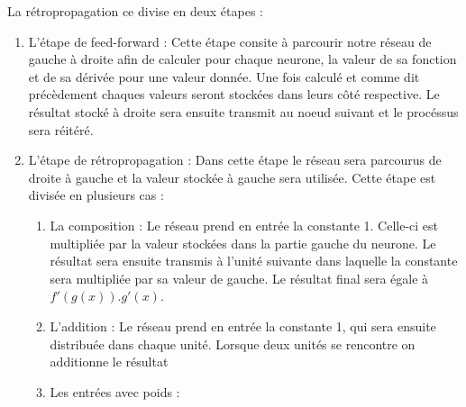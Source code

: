 \documentclass{article}
\begin{document}
La rétropropagation ce divise en deux étapes :
\begin{enumerate}
\item L'étape de feed-forward : Cette étape consite à parcourir notre réseau de gauche à droite afin de calculer pour chaque neurone, la valeur de sa fonction et de sa dérivée pour une valeur donnée. Une fois calculé et comme dit précèdement chaques valeurs seront stockées dans leurs côté respective. Le résultat stocké à droite sera ensuite transmit au noeud suivant et le procéssus sera réitéré. %
\item L'étape de rétropropagation : Dans cette étape le réseau sera parcourus de droite à gauche et la valeur stockée à gauche sera 
utilisée. Cette étape est divisée en plusieurs cas :
\begin{enumerate}
\item La composition  : Le réseau prend en entrée la constante 1. Celle-ci est multipliée par la valeur stockées dans la partie gauche du neurone. Le résultat sera ensuite transmis à l'unité suivante dans laquelle la constante sera multipliée par sa valeur de gauche. Le résultat final sera égale à $f'(g(x)).g'(x)$.
\vfill
\begin{center}
\end{center}
\vfill
\item L'addition : Le réseau prend en entrée la constante 1, qui sera ensuite distribuée dans chaque unité. Lorsque deux unités se rencontre on additionne le résultat 
\vfill
\begin{center}
\end{center}
\vfill
\item Les entrées avec poids : 
\end{enumerate}
\end{enumerate}
\end{document}
